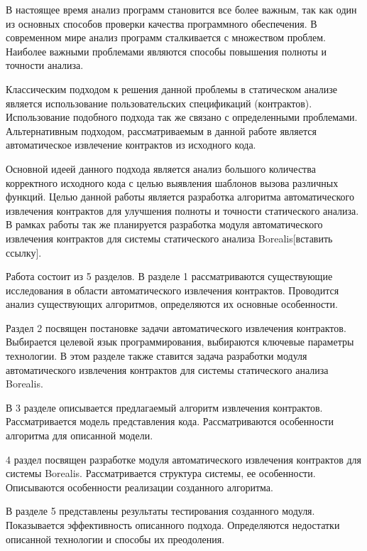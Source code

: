 \intro
В настоящее время анализ программ становится все более важным, так как один из основных способов проверки качества программного обеспечения. В современном мире анализ программ сталкивается с множеством проблем.  Наиболее важными проблемами являются способы повышения полноты и точности анализа.

Классическим подходом к решения данной проблемы в статическом анализе является использование пользовательских спецификаций (контрактов). Использование подобного подхода так же связано с определенными проблемами. Альтернативным подходом, рассматриваемым в данной работе является автоматическое извлечение контрактов из исходного кода.

Основной идеей данного подхода является анализ большого количества корректного исходного кода с целью выявления шаблонов вызова различных функций. Целью данной работы является разработка алгоритма автоматического извлечения контрактов для улучшения полноты и точности статического анализа. В рамках работы так же планируется разработка модуля автоматического извлечения контрактов для системы статического анализа Borealis[вставить ссылку].

Работа состоит из 5 разделов. В разделе 1 рассматриваются существующие исследования в области автоматического извлечения контрактов. Проводится анализ существующих алгоритмов, определяются их основные особенности.

Раздел 2 посвящен постановке задачи автоматического извлечения контрактов. Выбирается целевой язык программирования, выбираются ключевые параметры технологии. В этом разделе также ставится задача разработки модуля автоматического извлечения контрактов для системы статического анализа Borealis.

В 3 разделе описывается предлагаемый алгоритм извлечения контрактов. Рассматривается модель представления кода. Рассматриваются особенности алгоритма для описанной модели.

4 раздел посвящен разработке модуля автоматического извлечения контрактов для системы Borealis. Рассматривается структура системы, ее особенности. Описываются особенности реализации созданного алгоритма.

В разделе 5 представлены результаты тестирования созданного модуля. Показывается эффективность описанного подхода. Определяются недостатки описанной технологии и способы их преодоления.
